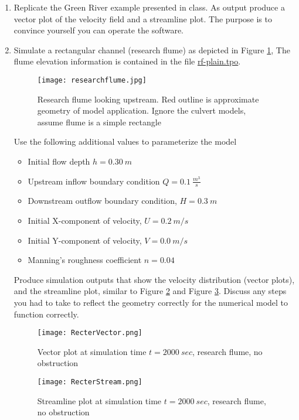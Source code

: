 \documentclass[12pt]{article}
\begin{document}
\begin{enumerate}
\item Replicate the Green River example presented in class.  
As output produce a vector plot of the velocity field  and a streamline plot.
The purpose is to convince yourself you can operate the software.

\item Simulate a rectangular channel (research flume) as depicted in Figure \ref{fig:ResearchFlumePlain},
The flume elevation information is contained in the file \url{rf-plain.tpo}.  

\begin{figure}[h!] %
   \centering
   \texttt{[image: researchflume.jpg]} 
   \caption{Research flume looking upstream.  Red outline is approximate geometry of model application.  Ignore the culvert models, assume flume is a simple rectangle}
   \label{fig:ResearchFlumePlain}
\end{figure}

   Use the  following additional values to parameterize the model
\begin{itemize}
\item Initial flow depth $h = 0.30 ~ m$
\item Upstream inflow boundary condition $Q= 0.1~\frac{m^3}{s}$
\item Downstream outflow boundary condition, $H = 0.3~m$
\item Initial X-component of velocity, $U = 0.2~m/s$
\item Initial Y-component of velocity, $V = 0.0~m/s$
\item Manning's roughness coefficient $n= 0.04$
\end{itemize}

Produce simulation outputs that show the velocity distribution (vector plots), and the streamline plot, similar to Figure \ref{fig:RecterVector} and Figure \ref{fig:RecterStream}.
Discuss any steps you had to take to reflect the geometry correctly for the numerical model to function correctly.

\begin{figure}[h!] %
   \centering
   \texttt{[image: RecterVector.png]} 
   \caption{Vector plot at simulation time $t=2000~sec$, research flume, no obstruction}
   \label{fig:RecterVector}
\end{figure}

\begin{figure}[h!] %
   \centering
   \texttt{[image: RecterStream.png]} 
   \caption{Streamline plot at simulation time $t=2000~sec$, research flume, no obstruction}
   \label{fig:RecterStream}
\end{figure}


\end{enumerate}
\end{document}

